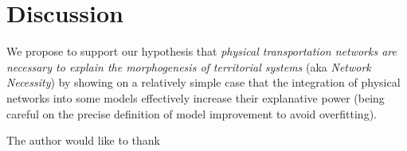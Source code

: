 \documentclass[Royal,sageh,times]{sagej}
\begin{document}
\section{Discussion}




We propose to support our hypothesis that \textit{physical transportation networks are necessary to explain the morphogenesis of territorial systems} (aka \textit{Network Necessity}) by showing on a relatively simple case that the integration of physical networks into some models effectively increase their explanative power (being careful on the precise definition of model improvement to avoid overfitting).






\begin{acks}
The author would like to thank
\end{acks}







\end{document}
